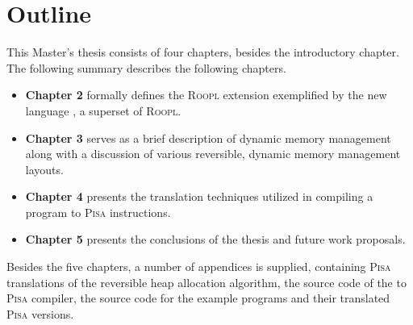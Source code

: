 \section{Outline}
\label{sec:outline}
This Master's thesis consists of four chapters, besides the introductory chapter. The following summary describes the following chapters.
\begin{itemize}
    \item \textbf{Chapter 2} formally defines the \textsc{Roopl} extension exemplified by the new language \rooplpp, a superset of \textsc{Roopl}.
    \item \textbf{Chapter 3} serves as a brief description of dynamic memory management along with a discussion of various reversible, dynamic memory management layouts.
    \item \textbf{Chapter 4} presents the translation techniques utilized in compiling a \rooplpp program to \textsc{Pisa} instructions.
    \item \textbf{Chapter 5} presents the conclusions of the thesis and future work proposals.
\end{itemize}

Besides the five chapters, a number of appendices is supplied, containing \textsc{Pisa} translations of the reversible heap allocation algorithm, the source code of the \rooplpp to \textsc{Pisa} compiler, the \rooplpp source code for the example programs and their translated \textsc{Pisa} versions.
